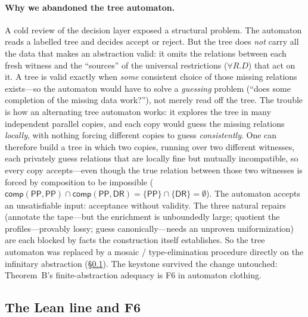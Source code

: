 \documentclass[11pt]{article}
\newcommand{\DR}{\mathsf{DR}}
\newcommand{\PP}{\mathsf{PP}}
\newcommand{\comp}{\ensuremath{\mathsf{comp}}}
\theoremstyle{plain}
\theoremstyle{definition}
\begin{document}
\paragraph{Why we abandoned the tree automaton.} A cold review of the
decision layer exposed a structural problem. The automaton reads a
labelled tree and decides accept or reject. But the tree does \emph{not}
carry all the data that makes an abstraction valid: it omits the
relations between each fresh witness and the ``sources'' of the universal
restrictions ($\forall R.D$) that act on it. A tree is valid exactly when
\emph{some} consistent choice of those missing relations exists---so the
automaton would have to solve a \emph{guessing} problem (``does some
completion of the missing data work?''), not merely read off the tree.
The trouble is how an alternating tree automaton works: it explores the
tree in many independent parallel copies, and each copy would guess the
missing relations \emph{locally}, with nothing forcing different copies to
guess \emph{consistently}. One can therefore build a tree in which two
copies, running over two different witnesses, each privately guess
relations that are locally fine but mutually incompatible, so every copy
accepts---even though the true relation between those two witnesses is
forced by composition to be impossible ($\comp(\PP,\PP)\cap
\comp(\PP,\DR)=\{\PP\}\cap\{\DR\}=\emptyset$). The automaton accepts an
unsatisfiable input: acceptance without validity. The three natural repairs (annotate the tape---but the
enrichment is unboundedly large; quotient the profiles---provably lossy;
guess canonically---needs an unproven uniformization) are each blocked by
facts the construction itself establishes. So the tree automaton was
replaced by a mosaic / type-elimination procedure directly on the
infinitary abstraction (\S\ref{ssec:approach-lean}). The keystone survived
the change untouched: Theorem~B's finite-abstraction adequacy is F6 in
automaton clothing.

\subsection{The Lean line and F6}
\label{ssec:approach-lean}
\end{document}
